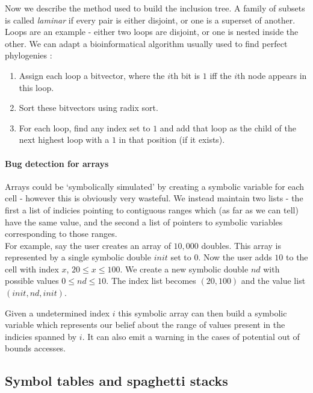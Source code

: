 \documentclass[12pt,a4paper]{article}
\begin{document}
Now we describe the method used to build the inclusion tree. A family of subsets is called \emph{laminar} if every pair is either disjoint,
or one is a superset of another. Loops are an example - either two loops are disjoint, or one is nested inside
the other. We can adapt a bioinformatical algorithm usually used to find perfect phylogenies \citep{gusfield}:

\begin{enumerate}
\item Assign each loop a bitvector, where the $i$th bit is $1$ iff the $i$th node appears in this loop.
\item Sort these bitvectors using radix sort.
\item For each loop, find any index set to $1$ and add that loop as the child of the next highest loop with a $1$ in that position (if it exists).
\end{enumerate}

\paragraph{Bug detection for arrays}
Arrays could be `symbolically simulated' by creating a symbolic variable for each cell - however this is obviously very wasteful. We instead maintain two lists - 
the first a list of indicies pointing to contiguous ranges which (as far as we can tell) have the same value, and the second a list of pointers to symbolic variables corresponding to those ranges.\\
For example, say the user creates an array of $10,000$ doubles. This array is represented
by a single symbolic double $init$ set to 0. Now the user adds $10$ to the cell with index $x$, $20 \leq x \leq 100$. We create a new symbolic double $nd$ with possible values $0 \leq nd \leq 10$.
The index list becomes $(20, 100)$ and the value list $(init, nd, init)$.

Given a undetermined index $i$ this symbolic array can then build a symbolic variable which represents our belief about the range of values present in the indicies spanned by $i$. It
can also emit a warning in the cases of potential out of bounds accesses.

\subsection{Symbol tables and spaghetti stacks} \label{app:spaghetti}
\end{document}
